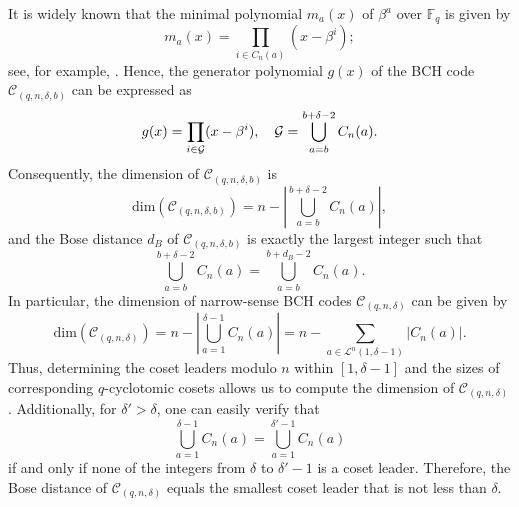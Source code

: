 \documentclass[journal,onecolumn]{IEEEtran}
\begin{document}
It is widely known that the minimal polynomial $m_a(x)$ of $\beta^a$
over $\mathbb{F}_q$ 
is  given by 
\begin{equation*}m_a(x)= \prod\limits_{i\in C_n(a)}(x-\beta^i); \end{equation*} see, for example, \cite[Theorem 4.1.1]{Hou2018}.  
Hence, the generator polynomial  $g(x)$ of the  BCH code $\mathcal{C}_{(q,n,\delta,b)}$ can be expressed as 
\begin{equation}\notag
g(x)= \prod\limits_{i\in \mathcal{G}}(x-\beta^i),\quad \mathcal{G}=\bigcup\limits_{a=b}^{b+\delta-2}C_n(a).
\end{equation}
 Consequently,  
the dimension of $\mathcal{C}_{(q,n,\delta,b)}$ is 
\begin{equation}\label{ndimeq}
    \mathrm{dim}(\mathcal{C}_{(q,n,\delta,b)})=n-\left|\bigcup\limits_{a=b}^{b+\delta-2}C_n(a)\right|,
\end{equation}
and the Bose distance $d_B$ of $\mathcal{C}_{(q,n,\delta,b)}$ is exactly the largest integer such that 
\begin{equation}\label{boseeq}
    \bigcup\limits_{a=b}^{b+\delta-2}C_n(a) = \bigcup\limits_{a=b}^{b+d_B-2}C_n(a).
\end{equation}
In particular, 
the dimension of narrow-sense BCH codes $\mathcal{C}_{(q,n,\delta)}$ can be given by  \begin{equation}\label{dimeq}
    \mathrm{dim}(\mathcal{C}_{(q,n,\delta)})=n-\left|\bigcup\limits_{a=1}^{\delta-1}C_n(a)\right|=n-\sum\limits_{a\in  \mathcal{L}^n(1,\delta-1) }|C_n(a)|. 
    \end{equation}
Thus, determining the coset leaders modulo 
$n$ within 
 $[1,\delta-1]$  
 and the sizes of corresponding $q$-cyclotomic  cosets allows us to compute the dimension of $\mathcal{C}_{(q,n,\delta)}$. 
Additionally, for $\delta' > \delta$, one can easily verify that
\begin{equation*}
   \bigcup_{a=1}^{\delta-1} C_n(a) = \bigcup_{a=1}^{\delta'-1} C_n(a)
\end{equation*}
if and only if none of the integers from $\delta$ to $\delta'-1$ is a coset leader.
Therefore, the Bose distance of $\mathcal{C}_{(q,n,\delta)}$ equals the smallest coset leader that is not less than $\delta$.
\end{document}

